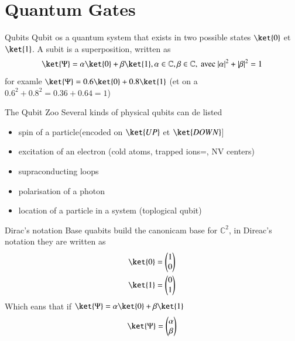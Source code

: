 \section{Quantum Gates}

\begin{frame}{Qubits}
Qubit os a quantum system that exists in two possible states  $\ket{0}$ et $\ket{1}$. 
\newline \newline
A subit is a superposition, written as 
\begin{equation*}
    \ket{\Psi} = \alpha\ket{0}+\beta\ket{1}, \alpha \in \mathbb{C}, \beta \in \mathbb{C},  
    \textrm{ avec } |\alpha|^2+ |\beta|^2 = 1
\end{equation*}
for examle $\ket{\Psi} = 0.6\ket{0} + 0.8\ket{1}$ (et on a $0.6^2+0.8^2 = 0.36+0.64=1$)
\end{frame}

\begin{frame}{The Qubit Zoo}
Several kinds of physical qubits can de listed
\begin{itemize}
    \item spin of a particle(encoded on $\ket{UP}$ et $\ket{DOWN}$]
    \item excitation of an electron  (cold atoms, trapped ions=,  NV centers)
    \item supraconducting loops
    \item polarisation of a photon
    \item location of a particle in a system (toplogical qubit)
\end{itemize}
\end{frame}

\begin{frame}{Dirac's notation}
    Base quabits build the canonicam base for $\mathbb{C}^2$, in Direac's notation they are written as
\begin{equation*}
    \begin{split}
        \ket{0} &= \begin{pmatrix} 1 \\ 0 \end{pmatrix} \\
        \ket{1} &= \begin{pmatrix} 0 \\ 1 \end{pmatrix} \\
    \end{split}
\end{equation*}
Which eans that if $\ket{\Psi} = \alpha\ket{0}+\beta\ket{1}$
\begin{equation*}
    \ket{\Psi} = \begin{pmatrix} \alpha \\ \beta \end{pmatrix}
\end{equation*}
\end{frame}

